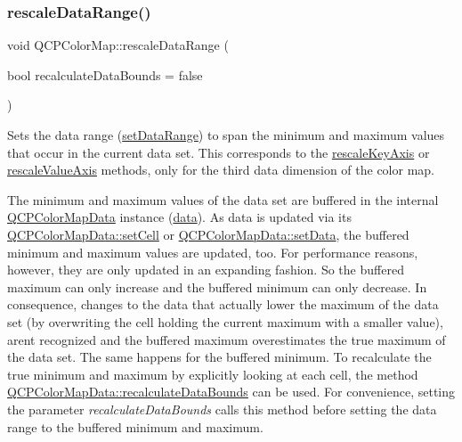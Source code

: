 \mbox{\label{class_q_c_p_color_map_a856608fa3dd1cc290bcd5f29a5575774}} 
\subsubsection{\texorpdfstring{rescale\+Data\+Range()}{rescaleDataRange()}}
{\footnotesize\ttfamily void Q\+C\+P\+Color\+Map\+::rescale\+Data\+Range (\begin{DoxyParamCaption}\item[{bool}]{recalculate\+Data\+Bounds = {\ttfamily false} }\end{DoxyParamCaption})}

Sets the data range (\hyperlink{class_q_c_p_color_map_a980b42837821159786a85b4b7dcb8774}{set\+Data\+Range}) to span the minimum and maximum values that occur in the current data set. This corresponds to the \hyperlink{class_q_c_p_abstract_plottable_ae96b83c961e257da116c6acf9c7da308}{rescale\+Key\+Axis} or \hyperlink{class_q_c_p_abstract_plottable_a714eaf36b12434cd71846215504db82e}{rescale\+Value\+Axis} methods, only for the third data dimension of the color map.

The minimum and maximum values of the data set are buffered in the internal \hyperlink{class_q_c_p_color_map_data}{Q\+C\+P\+Color\+Map\+Data} instance (\hyperlink{class_q_c_p_color_map_a047d7eb3ae657f93f2f39b5e68b79451}{data}). As data is updated via its \hyperlink{class_q_c_p_color_map_data_a8e75eaf8746596319032a93f3d2d0683}{Q\+C\+P\+Color\+Map\+Data\+::set\+Cell} or \hyperlink{class_q_c_p_color_map_data_afd2083ccfd6987ec94aa7ef8e91ca39a}{Q\+C\+P\+Color\+Map\+Data\+::set\+Data}, the buffered minimum and maximum values are updated, too. For performance reasons, however, they are only updated in an expanding fashion. So the buffered maximum can only increase and the buffered minimum can only decrease. In consequence, changes to the data that actually lower the maximum of the data set (by overwriting the cell holding the current maximum with a smaller value), aren\textquotesingle{}t recognized and the buffered maximum overestimates the true maximum of the data set. The same happens for the buffered minimum. To recalculate the true minimum and maximum by explicitly looking at each cell, the method \hyperlink{class_q_c_p_color_map_data_ab235ade8a4d64bd3adb26a99b3dd57ee}{Q\+C\+P\+Color\+Map\+Data\+::recalculate\+Data\+Bounds} can be used. For convenience, setting the parameter {\itshape recalculate\+Data\+Bounds} calls this method before setting the data range to the buffered minimum and maximum.

